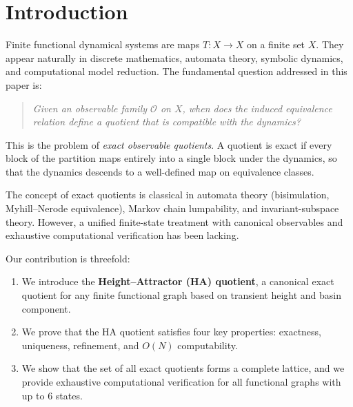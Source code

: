 \documentclass[11pt, a4paper]{article}
\theoremstyle{definition}
\theoremstyle{remark}
\begin{document}
\begin{abstract}
Special cases yield closed-form formulas: constant and identity maps have \(\mathrm{Bell}(n)\) exact quotients; a single \(n\)-cycle has exactly \(d(n)\) quotients, corresponding to cyclic subgroups.

The HA quotient provides a \textbf{certifiable, canonical, and computationally efficient} observable reduction for finite functional graphs, with applications to symbolic dynamics, finite automata minimization, and model reduction of deterministic systems.
\end{abstract}

\section{Introduction}

Finite functional dynamical systems are maps \(T: X \to X\) on a finite set \(X\). They appear naturally in discrete mathematics, automata theory, symbolic dynamics, and computational model reduction. The fundamental question addressed in this paper is:

\begin{quote}
\textit{Given an observable family \(\mathcal O\) on \(X\), when does the induced equivalence relation define a quotient that is compatible with the dynamics?}
\end{quote}

This is the problem of \emph{exact observable quotients}. A quotient is exact if every block of the partition maps entirely into a single block under the dynamics, so that the dynamics descends to a well-defined map on equivalence classes.

The concept of exact quotients is classical in automata theory (bisimulation, Myhill–Nerode equivalence), Markov chain lumpability, and invariant-subspace theory. However, a unified finite-state treatment with canonical observables and exhaustive computational verification has been lacking.

Our contribution is threefold:

\begin{enumerate}
\item We introduce the \textbf{Height–Attractor (HA) quotient}, a canonical exact quotient for any finite functional graph based on transient height and basin component.
\item We prove that the HA quotient satisfies four key properties: exactness, uniqueness, refinement, and \(O(N)\) computability.
\item We show that the set of all exact quotients forms a complete lattice, and we provide exhaustive computational verification for all functional graphs with up to 6 states.
\end{enumerate}
\end{document}
